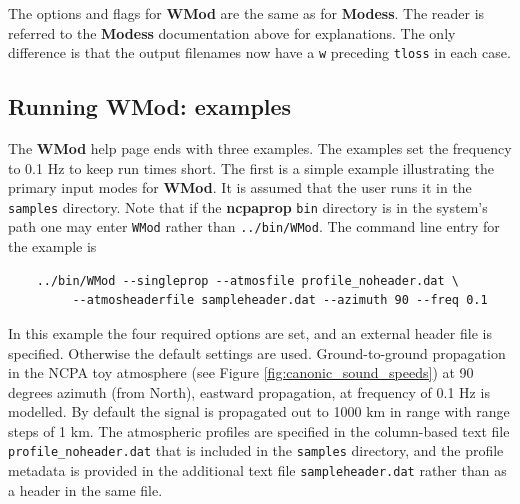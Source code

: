 The options and flags for {\bf WMod} are the same as for {\bf Modess}. The reader is referred to the {\bf Modess} documentation above for explanations. The only difference is that the output filenames now have a \verb+w+ preceding \verb+tloss+ in each case. 


\subsection{Running WMod: examples}
\label{sec: wmod examples}

The \textbf{WMod} help page ends with three examples. The examples set the frequency to 0.1 Hz to keep run times short. The first is a simple example illustrating the primary input modes for \textbf{WMod}. It is assumed that the user runs it in the \verb+samples+ directory. Note that if the \textbf{ncpaprop} \verb+bin+ directory is in the system's path one may enter \verb+WMod+ rather than \verb+../bin/WMod+. The command line entry for the example is 
\begin{verbatim} 
    ../bin/WMod --singleprop --atmosfile profile_noheader.dat \
         --atmosheaderfile sampleheader.dat --azimuth 90 --freq 0.1
\end{verbatim}
In this example the four required options are set, and an external header file is specified. Otherwise the default settings are used. Ground-to-ground propagation in the NCPA toy atmosphere (see Figure \ref{fig:canonic_sound_speeds}) at 90 degrees azimuth (from North), eastward propagation, at frequency of 0.1 Hz is modelled. By default the signal is propagated out to 1000 km in range with range steps of 1 km. The atmospheric profiles are specified in the column-based text file \verb"profile_noheader.dat" that is included in the \verb+samples+ directory, and the profile metadata is provided in the additional text file \verb"sampleheader.dat" rather than as a header in the same file. 

